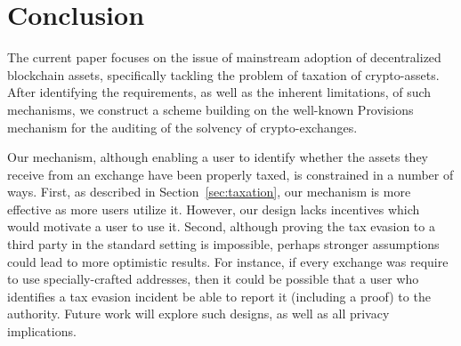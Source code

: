 \section{Conclusion}\label{sec:conclusion}

The current paper focuses on the issue of mainstream adoption of decentralized
blockchain assets, specifically tackling the problem of taxation of
crypto-assets. After identifying the requirements, as well as the inherent
limitations, of such mechanisms, we construct a scheme building on the
well-known Provisions mechanism for the auditing of the solvency of
crypto-exchanges.

Our mechanism, although enabling a user to identify whether the assets they
receive from an exchange have been properly taxed, is constrained in a number
of ways. First, as described in Section~\ref{sec:taxation}, our mechanism is
more effective as more users utilize it. However, our design lacks incentives
which would motivate a user to use it. Second, although proving the tax evasion
to a third party in the standard setting is impossible, perhaps stronger
assumptions could lead to more optimistic results. For instance, if every
exchange was require to use specially-crafted addresses, then it could be
possible that a user who identifies a tax evasion incident be able to report it
(including a proof) to the authority. Future work will explore such designs, as
well as all privacy implications.
